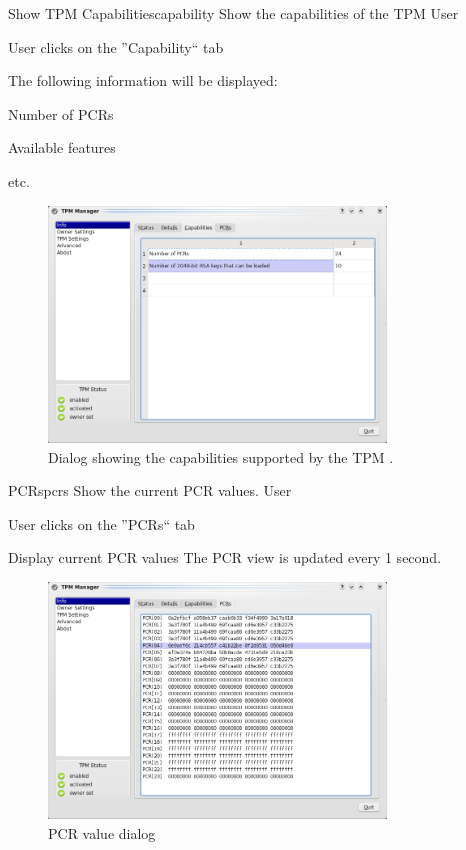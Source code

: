 \documentclass[
  american        %
]{sirrixreport}
\begin{document}
\begin{usecase}{Show TPM Capabilities}{capability}
\ucdesc Show the capabilities of the TPM
\ucactors  User
\ucnormal 
 \item User clicks on the ''Capability`` tab
 \item The following information will be displayed:
   \begin{compactitem}
   \item Number of PCRs
   \item Available features
   \item etc.
   \end{compactitem}
\ucendflow 
\end{usecase}

\begin{figure}[h]
\centering
\includegraphics[width=0.8\textwidth]{images/tpm_capabilities}
\caption{Dialog showing the capabilities supported by the TPM .} 
\end{figure}
\clearpage


\begin{usecase}{PCRs}{pcrs}
\ucdesc Show the current PCR values.
\ucactors  User
\ucnormal 
 \item User clicks on the ''PCRs`` tab
 \item Display current PCR values
\ucendflow
\ucnote  The PCR view is updated every 1 second.
\end{usecase}

\begin{figure}[h]
 \centering
 \includegraphics[width=0.8\textwidth]{images/tpm_pcrs}
 \caption{PCR value dialog }
\end{figure}
\clearpage
\end{document}
